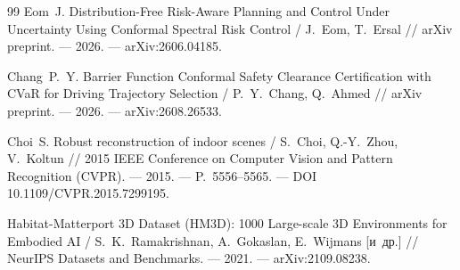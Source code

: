 \begin{thebibliography}{99}
 Eom~J. Distribution-Free Risk-Aware Planning and Control Under Uncertainty Using Conformal Spectral Risk Control / J.~Eom, T.~Ersal // arXiv preprint. --- 2026. --- arXiv:2606.04185.

 Chang~P.~Y. Barrier Function Conformal Safety Clearance Certification with CVaR for Driving Trajectory Selection / P.~Y.~Chang, Q.~Ahmed // arXiv preprint. --- 2026. --- arXiv:2608.26533.

 Choi~S. Robust reconstruction of indoor scenes / S.~Choi, Q.-Y.~Zhou, V.~Koltun // 2015 IEEE Conference on Computer Vision and Pattern Recognition (CVPR). --- 2015. --- P.~5556--5565. --- DOI 10.1109/CVPR.2015.7299195.

 Habitat-Matterport 3D Dataset (HM3D): 1000 Large-scale 3D Environments for Embodied AI / S.~K.~Ramakrishnan, A.~Gokaslan, E.~Wijmans [и~др.] // NeurIPS Datasets and Benchmarks. --- 2021. --- arXiv:2109.08238.

\end{thebibliography}
